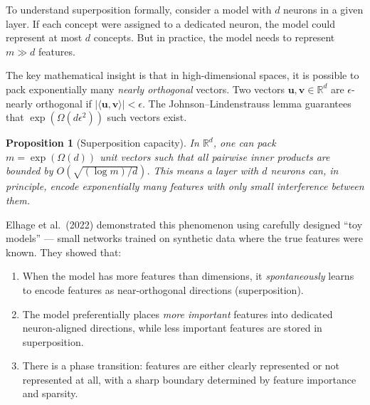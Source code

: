 \documentclass[11pt, a4paper]{article}
\theoremstyle{definition}
\theoremstyle{plain}
\newtheorem{proposition}{Proposition}[section]
\begin{document}
To understand superposition formally, consider a model with $d$ neurons
in a given layer.  If each concept were assigned to a dedicated neuron,
the model could represent at most $d$ concepts.  But in practice, the
model needs to represent $m \gg d$ features.

The key mathematical insight is that in high-dimensional spaces, it is
possible to pack exponentially many \emph{nearly orthogonal} vectors.
Two vectors $\mathbf{u}, \mathbf{v} \in \mathbb{R}^d$ are
$\epsilon$-nearly orthogonal if $|\langle \mathbf{u}, \mathbf{v}
\rangle| < \epsilon$.  The Johnson--Lindenstrauss lemma guarantees
that $\exp(\Omega(d\epsilon^2))$ such vectors exist.

\begin{proposition}[Superposition capacity]
In $\mathbb{R}^d$, one can pack $m = \exp(\Omega(d))$ unit vectors
such that all pairwise inner products are bounded by
$O(\sqrt{(\log m)/d})$.  This means a layer with $d$ neurons can, in
principle, encode exponentially many features with only small
interference between them.
\end{proposition}

Elhage et al.\ (2022) demonstrated this phenomenon using carefully
designed ``toy models'' --- small networks trained on synthetic data
where the true features were known.  They showed that:

\begin{enumerate}[leftmargin=2em]
  \item When the model has more features than dimensions, it
    \emph{spontaneously} learns to encode features as near-orthogonal
    directions (superposition).
  \item The model preferentially places \emph{more important} features
    into dedicated neuron-aligned directions, while less important features
    are stored in superposition.
  \item There is a phase transition: features are either clearly
    represented or not represented at all, with a sharp boundary
    determined by feature importance and sparsity.
\end{enumerate}
\end{document}
